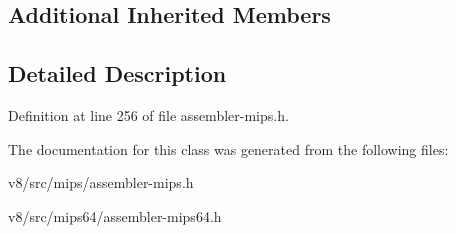 \subsection*{Additional Inherited Members}


\subsection{Detailed Description}


Definition at line 256 of file assembler-\/mips.\+h.



The documentation for this class was generated from the following files\+:\begin{DoxyCompactItemize}
\item 
v8/src/mips/assembler-\/mips.\+h\item 
v8/src/mips64/assembler-\/mips64.\+h\end{DoxyCompactItemize}
